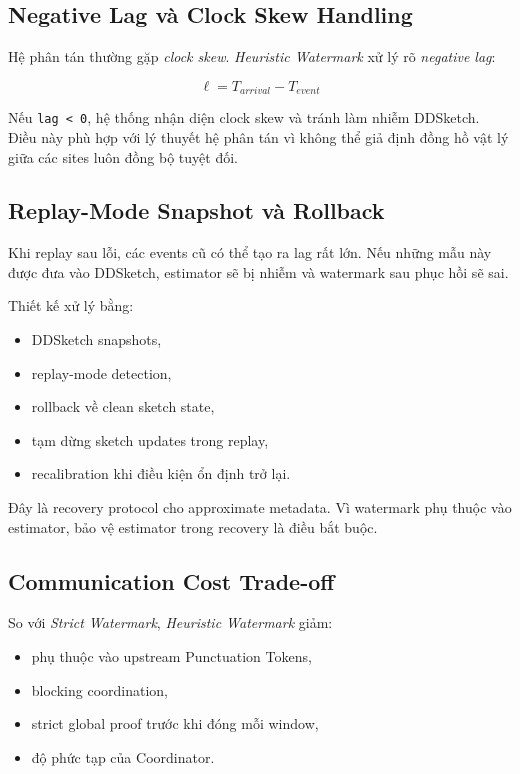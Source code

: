 \documentclass[12pt,a4paper]{article}
\begin{document}
\subsection{Negative Lag và Clock Skew Handling}

Hệ phân tán thường gặp \textit{clock skew}. \textit{Heuristic Watermark} xử lý rõ \textit{negative lag}:

{\large
\begin{equation}
    \boxed{\ell = T_{arrival} - T_{event}}
\end{equation}
}

Nếu \texttt{lag < 0}, hệ thống nhận diện clock skew và tránh làm nhiễm DDSketch. Điều này phù hợp với lý thuyết hệ phân tán vì không thể giả định đồng hồ vật lý giữa các sites luôn đồng bộ tuyệt đối.

\subsection{Replay-Mode Snapshot và Rollback}

Khi replay sau lỗi, các events cũ có thể tạo ra lag rất lớn. Nếu những mẫu này được đưa vào DDSketch, estimator sẽ bị nhiễm và watermark sau phục hồi sẽ sai.

Thiết kế xử lý bằng:

\begin{itemize}
    \item DDSketch snapshots,
    \item replay-mode detection,
    \item rollback về clean sketch state,
    \item tạm dừng sketch updates trong replay,
    \item recalibration khi điều kiện ổn định trở lại.
\end{itemize}

Đây là recovery protocol cho approximate metadata. Vì watermark phụ thuộc vào estimator, bảo vệ estimator trong recovery là điều bắt buộc.

\subsection{Communication Cost Trade-off}

So với \textit{Strict Watermark}, \textit{Heuristic Watermark} giảm:

\begin{itemize}
    \item phụ thuộc vào upstream Punctuation Tokens,
    \item blocking coordination,
    \item strict global proof trước khi đóng mỗi window,
    \item độ phức tạp của Coordinator.
\end{itemize}
\end{document}
